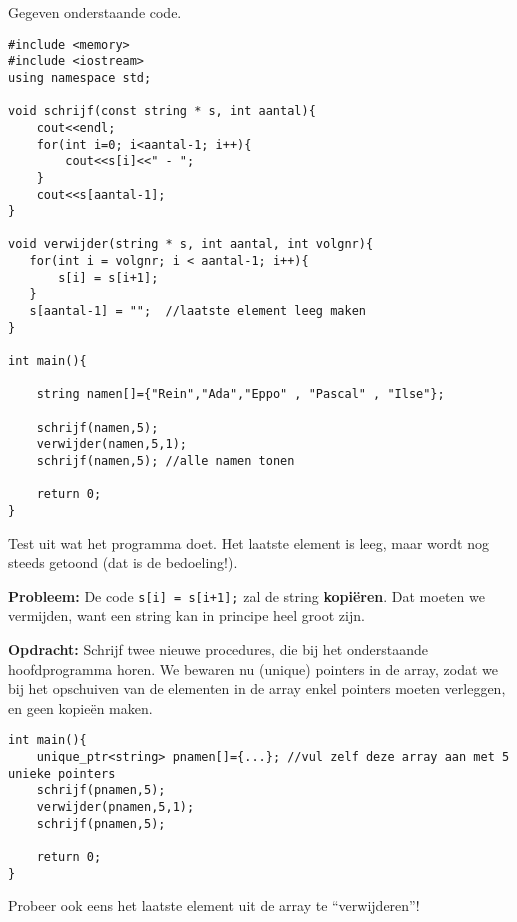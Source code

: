 \beginoef

Gegeven onderstaande code.
\begin{footnotesize}
\begin{verbatim}
#include <memory>
#include <iostream>
using namespace std;

void schrijf(const string * s, int aantal){
    cout<<endl;
    for(int i=0; i<aantal-1; i++){
        cout<<s[i]<<" - ";
    }
    cout<<s[aantal-1];
}

void verwijder(string * s, int aantal, int volgnr){
   for(int i = volgnr; i < aantal-1; i++){
       s[i] = s[i+1];	
   }  
   s[aantal-1] = "";  //laatste element leeg maken
}

int main(){
	
    string namen[]={"Rein","Ada","Eppo" , "Pascal" , "Ilse"};
	
    schrijf(namen,5);
    verwijder(namen,5,1);
    schrijf(namen,5); //alle namen tonen
	
    return 0;
}
\end{verbatim}
\end{footnotesize}
Test uit wat het programma doet. Het laatste element is leeg, maar wordt nog steeds getoond (dat is de bedoeling!).

{\bf Probleem:} De code \verb}s[i] = s[i+1];} zal de string {\bf kopi\"eren}.
Dat moeten we vermijden, want een string kan in principe heel groot zijn. 

{\bf Opdracht:} Schrijf twee nieuwe procedures, die bij het onderstaande hoofdprogramma horen.
We bewaren nu (unique) pointers in de array, zodat we bij het opschuiven van de elementen in de array
enkel pointers moeten verleggen, en geen kopie\"en maken.
\begin{footnotesize}
\begin{verbatim}
int main(){
    unique_ptr<string> pnamen[]={...}; //vul zelf deze array aan met 5 unieke pointers
    schrijf(pnamen,5);
    verwijder(pnamen,5,1);
    schrijf(pnamen,5);
	
    return 0;
}
\end{verbatim}
\end{footnotesize}
Probeer ook eens het laatste element uit de array te ``verwijderen''!

\endoef
